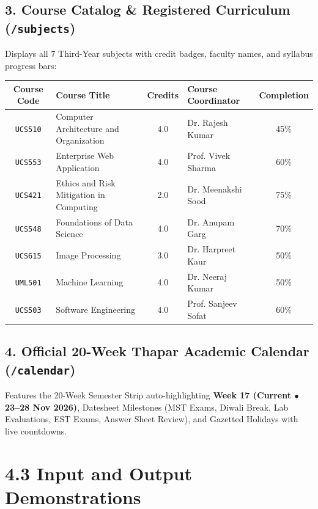 \documentclass[12pt,a4paper]{report}
\begin{document}
\subsection{3. Course Catalog \& Registered Curriculum (\texttt{/subjects})}
Displays all 7 Third-Year subjects with credit badges, faculty names, and syllabus progress bars:

\vspace{0.2cm}
\begin{table}[h!]
\centering
\begin{tabularx}{\textwidth}{|c|X|c|X|c|}
\hline
\rowcolor{CodeBorder}
\textbf{Course Code} & \textbf{Course Title} & \textbf{Credits} & \textbf{Course Coordinator} & \textbf{Completion} \\ \hline
\texttt{UCS510} & Computer Architecture and Organization & 4.0 & Dr. Rajesh Kumar & 45\% \\ \hline
\texttt{UCS553} & Enterprise Web Application & 4.0 & Prof. Vivek Sharma & 60\% \\ \hline
\texttt{UCS421} & Ethics and Risk Mitigation in Computing & 2.0 & Dr. Meenakshi Sood & 75\% \\ \hline
\texttt{UCS548} & Foundations of Data Science & 4.0 & Dr. Anupam Garg & 70\% \\ \hline
\texttt{UCS615} & Image Processing & 3.0 & Dr. Harpreet Kaur & 50\% \\ \hline
\texttt{UML501} & Machine Learning & 4.0 & Dr. Neeraj Kumar & 50\% \\ \hline
\texttt{UCS503} & Software Engineering & 4.0 & Prof. Sanjeev Sofat & 60\% \\ \hline
\end{tabularx}
\end{table}

\subsection{4. Official 20-Week Thapar Academic Calendar (\texttt{/calendar})}
Features the 20-Week Semester Strip auto-highlighting \textbf{Week 17 (Current $\bullet$ 23–28 Nov 2026)}, Datesheet Milestones (MST Exams, Diwali Break, Lab Evaluations, EST Exams, Answer Sheet Review), and Gazetted Holidays with live countdowns.

\section{4.3 Input and Output Demonstrations}
\end{document}

